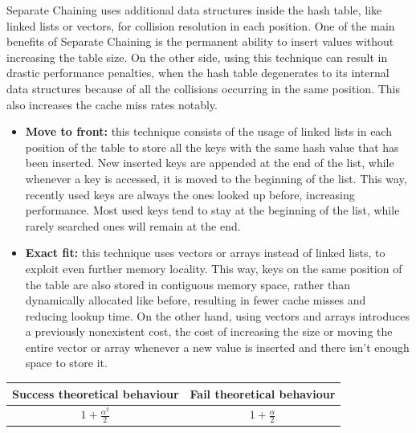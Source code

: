 \documentclass{article}
\begin{document}
    Separate Chaining uses additional data structures inside the hash table, like linked lists or vectors, for collision resolution in each position. One of the main benefits of Separate Chaining is the permanent ability to insert values without increasing the table size. On the other side, using this technique can result in drastic performance penalties, when the hash table degenerates to its internal data structures because of all the collisions occurring in the same position. This also increases the cache miss rates notably.
\begin{itemize}
    \item \textbf{Move to front:} this technique consists of the usage of linked lists in each position of the table to store all the keys with the same hash value that has been inserted. New inserted keys are appended at the end of the list, while whenever a key is accessed, it is moved to the beginning of the list. This way, recently used keys are always the ones looked up before, increasing performance. Most used keys tend to stay at the beginning of the list, while rarely searched ones will remain at the end.

    \item \textbf{Exact fit:} this technique uses vectors or arrays instead of linked lists, to exploit even further memory locality. This way, keys on the same position of the table are also stored in contiguous memory space, rather than dynamically allocated like before, resulting in fewer cache misses and reducing lookup time. On the other hand, using vectors and arrays introduces a previously nonexistent cost, the cost of increasing the size or moving the entire vector or array whenever a new value is inserted and there isn't enough space to store it.
\end{itemize}

\begin{tabular}{c|c}
Success theoretical behaviour & Fail theoretical behaviour \\
\hline
$1 + \frac{\alpha^2}{2}$ & $1 + \frac{\alpha}{2}$ \\
 
\end{tabular}
    
\end{document}
